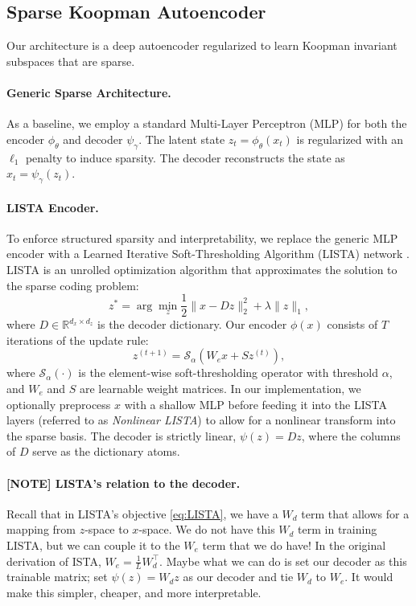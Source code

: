 \subsection{Sparse Koopman Autoencoder}
Our architecture is a deep autoencoder regularized to learn Koopman invariant subspaces that are sparse. 

\paragraph{Generic Sparse Architecture.}
As a baseline, we employ a standard Multi-Layer Perceptron (MLP) for both the encoder $\phi_\theta$ and decoder $\psi_\gamma$. The latent state $z_t = \phi_\theta(x_t)$ is regularized with an $\ell_1$ penalty to induce sparsity. The decoder reconstructs the state as $\hat{x}_t = \psi_\gamma(z_t)$.

\paragraph{LISTA Encoder.}
To enforce structured sparsity and interpretability, we replace the generic MLP encoder with a Learned Iterative Soft-Thresholding Algorithm (LISTA) network \citep{gregor_learning_2010}. LISTA is an unrolled optimization algorithm that approximates the solution to the sparse coding problem:
\begin{equation}\label{eq:LISTA}
    z^* = \arg\min_z \frac{1}{2} \|x - D z\|_2^2 + \lambda \|z\|_1,
\end{equation}
where $D \in \mathbb{R}^{d_x \times d_z}$ is the decoder dictionary.
Our encoder $\phi(x)$ consists of $T$ iterations of the update rule:
\begin{equation}
    z^{(t+1)} = \mathcal{S}_{\alpha} (W_e x + S z^{(t)}),
\end{equation}
where $\mathcal{S}_\alpha(\cdot)$ is the element-wise soft-thresholding operator with threshold $\alpha$, and $W_e$ and $S$ are learnable weight matrices. In our implementation, we optionally preprocess $x$ with a shallow MLP before feeding it into the LISTA layers (referred to as \textit{Nonlinear LISTA}) to allow for a nonlinear transform into the sparse basis. The decoder is strictly linear, $\psi(z) = D z$, where the columns of $D$ serve as the dictionary atoms.

\paragraph{[NOTE] LISTA's relation to the decoder.} 
Recall that in LISTA's objective \eqref{eq:LISTA}, we have a $W_d$ term that allows for a mapping from $z$-space to $x$-space. We do not have this $W_d$ term in training LISTA, but we can couple it to the $W_e$ term that we do have! In the original derivation of ISTA, $W_e = \frac{1}{L} W_d^\top$. Maybe what we can do is set our decoder as this trainable matrix; set $\psi(z) = W_d z$ as our decoder and tie $W_d$ to $W_e$. It would make this simpler, cheaper, and more interpretable.

